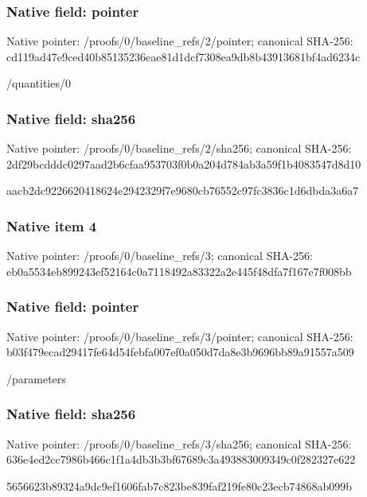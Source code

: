 \documentclass[10pt,a4paper]{article}
\begin{document}
\subsubsection{Native field: pointer}
Native pointer: /proofs/0/baseline\_\allowbreak{}refs/2/pointer; canonical SHA-256: cd119ad47e9ced40b85135236eae81d1dcf7308ea9db8b43913681bf4ad6234c

\begingroup\raggedright\sloppy /\allowbreak{}quantities/\allowbreak{}0\par\endgroup

\subsubsection{Native field: sha256}
Native pointer: /proofs/0/baseline\_\allowbreak{}refs/2/sha256; canonical SHA-256: 2df29bcdddc0297aad2b6cfaa953703f0b0a204d784ab3a59f1b4083547d8d10

\begingroup\raggedright\sloppy aacb2dc9226620418624e2942329f7e9680cb76552c97fc3836c1d6dbda3a6a7\par\endgroup

\subsubsection{Native item 4}
Native pointer: /proofs/0/baseline\_\allowbreak{}refs/3; canonical SHA-256: eb0a5534eb899243ef52164c0a7118492a83322a2e445f48dfa7f167e7f008bb

\subsubsection{Native field: pointer}
Native pointer: /proofs/0/baseline\_\allowbreak{}refs/3/pointer; canonical SHA-256: b03f479ecad29417fe64d54febfa007ef0a050d7da8e3b9696bb89a91557a509

\begingroup\raggedright\sloppy /\allowbreak{}parameters\par\endgroup

\subsubsection{Native field: sha256}
Native pointer: /proofs/0/baseline\_\allowbreak{}refs/3/sha256; canonical SHA-256: 636e4ed2cc7986b466c1f1a4db3b3bf67689c3a493883009349c0f282327e622

\begingroup\raggedright\sloppy 5656623b89324a9dc9ef1606fab7c823be839faf219fe80c23ecb74868ab099b\par\endgroup
\end{document}
